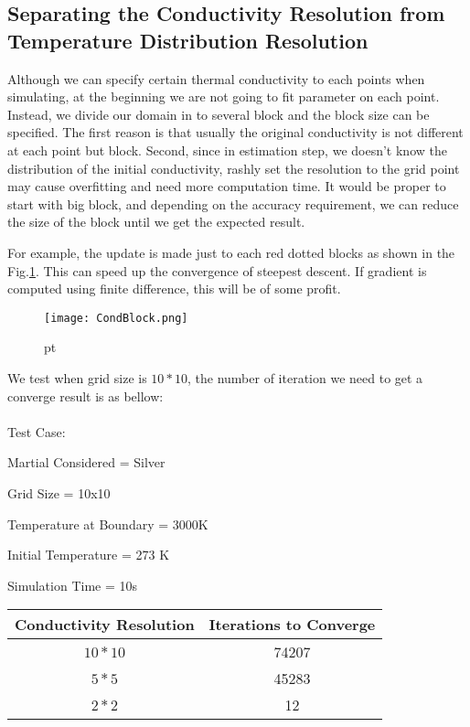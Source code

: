 \documentclass[10pt,a4paper]{report}
\begin{document}
\subsection{Separating the Conductivity Resolution from Temperature Distribution Resolution}
Although we can specify certain thermal conductivity to each points when simulating, at the beginning we are not going to fit parameter on each point. Instead, we divide our domain in to several block and the block size can be specified. The first reason is that usually the original conductivity is not different at each point but block. Second, since in estimation step, we doesn't know the distribution of the initial conductivity, rashly set the resolution to the grid point may cause overfitting and need more computation time. It would be proper to start with big block, and depending on the accuracy requirement, we can reduce the size of the block until we get the expected result.

For example,  the update is made just to each red dotted blocks as shown in the Fig.\ref{fig:CondBlock}. This can speed up the convergence of steepest descent. If gradient is computed using finite difference, this will be of some profit.

\begin{figure}[h]
\begin{center}
\texttt{[image: CondBlock.png]} 
\caption{}  pt
\label{fig:CondBlock}
\end{center}
\end{figure}

We test when grid size is $10*10$, the number of iteration we need to get a converge result is as bellow:\\
\\
Test Case:

Martial Considered =  Silver

Grid Size = 10x10

Temperature at Boundary = 3000K

Initial Temperature = 273 K

Simulation Time = 10s\\
\begin{center}

\begin{tabular}{ |c|c| } 
 \hline
 Conductivity Resolution & Iterations to Converge \\ 
 \hline
 $10*10$ & 74207 \\ 
 \hline
 $5*5$   & 45283\\
 \hline
 $2*2$   & 12 \\ 
 \hline
\end{tabular}
\end{center}
\end{document}
